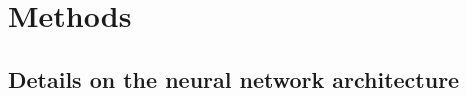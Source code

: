 \documentclass[%
superscriptaddress,
reprint,
nofootinbib,
amsmath,amssymb,amsfonts,
floatfix,
altaffilletter,
showkeys,
]{revtex4-2}
\begin{document}
\section*{Methods}
\label{sec:methods}

\subsection*{Details on the neural network architecture}
\label{sec:neural_network_architecture}

\end{document}
